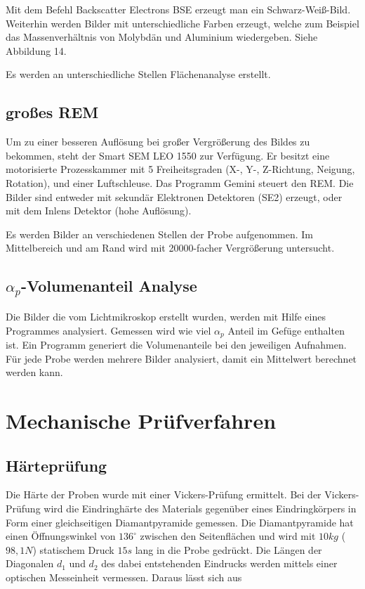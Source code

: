 Mit dem Befehl Backscatter Electrons BSE erzeugt man ein Schwarz-Weiß-Bild. Weiterhin werden Bilder mit unterschiedliche Farben erzeugt, welche zum Beispiel das Massenverhältnis von Molybdän und Aluminium wiedergeben. Siehe Abbildung 14.

Es werden an unterschiedliche Stellen Flächenanalyse erstellt. 

\subsection{großes REM}

Um zu einer besseren Auflösung bei großer Vergrößerung des Bildes zu bekommen, steht der Smart SEM LEO 1550 zur Verfügung. Er besitzt eine motorisierte Prozesskammer mit 5 Freiheitsgraden (X-, Y-, Z-Richtung, Neigung, Rotation), und einer Luftschleuse. Das Programm Gemini steuert den REM. Die Bilder sind entweder mit sekundär Elektronen Detektoren (SE2) erzeugt, oder mit dem Inlens Detektor (hohe Auflösung). 

Es werden Bilder an verschiedenen Stellen der Probe aufgenommen. Im Mittelbereich und am Rand wird mit 20000-facher Vergrößerung untersucht. 


\subsection{$\alpha_{p}$-Volumenanteil Analyse}

Die Bilder die vom Lichtmikroskop erstellt wurden, werden mit Hilfe eines Programmes analysiert. Gemessen wird wie viel $\alpha_{p}$ Anteil im Gefüge enthalten ist. Ein Programm generiert die Volumenanteile bei den jeweiligen Aufnahmen. Für jede Probe werden mehrere Bilder analysiert, damit ein Mittelwert berechnet werden kann. 



\section{Mechanische Prüfverfahren}

\subsection{Härteprüfung}

Die Härte der Proben wurde mit einer Vickers-Prüfung ermittelt. Bei der Vickers-Prüfung wird die Eindringhärte des Materials gegenüber eines Eindringkörpers in Form einer gleichseitigen Diamantpyramide gemessen. Die Diamantpyramide hat einen Öffnungswinkel von $136^\circ$ zwischen den Seitenflächen und wird mit $10 kg$ ($98,1 N$) statischem Druck $15 s$ lang in die Probe gedrückt. Die Längen der Diagonalen $d_1$ und $d_2$ des dabei entstehenden Eindrucks werden mittels einer optischen Messeinheit vermessen. Daraus lässt sich aus

